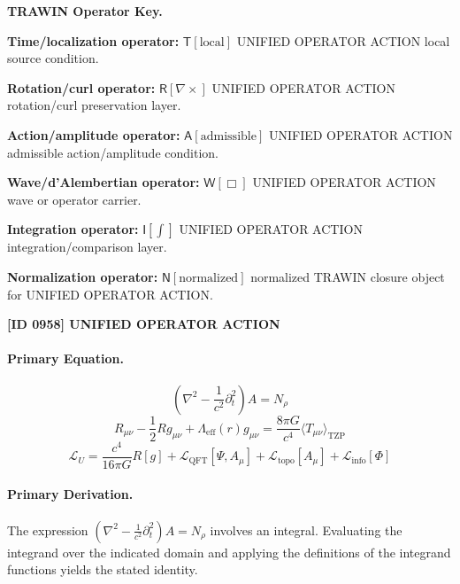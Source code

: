 \par\vspace{0.45\baselineskip}
\noindent\begin{minipage}[t]{\linewidth}
\begingroup
\small
\raggedright
\textbf{TRAWIN Operator Key.}\par
\noindent\textbf{Time/localization operator:} $\mathsf{T}\!\left[\mathrm{local}\right]$ UNIFIED OPERATOR ACTION local source condition.\par
\noindent\textbf{Rotation/curl operator:} $\mathsf{R}\!\left[\nabla\times\right]$ UNIFIED OPERATOR ACTION rotation/curl preservation layer.\par
\noindent\textbf{Action/amplitude operator:} $\mathsf{A}\!\left[\mathrm{admissible}\right]$ UNIFIED OPERATOR ACTION admissible action/amplitude condition.\par
\noindent\textbf{Wave/d'Alembertian operator:} $\mathsf{W}\!\left[\Box\right]$ UNIFIED OPERATOR ACTION wave or operator carrier.\par
\noindent\textbf{Integration operator:} $\mathsf{I}\!\left[\int\right]$ UNIFIED OPERATOR ACTION integration/comparison layer.\par
\noindent\textbf{Normalization operator:} $\mathsf{N}\!\left[\mathrm{normalized}\right]$ normalized TRAWIN closure object for UNIFIED OPERATOR ACTION.\par
\endgroup
\end{minipage}

\clearpage
\noindent\textbf{[ID 0958] UNIFIED OPERATOR ACTION}\par
\vspace{0.35em}
\paragraph{Primary Equation.}
\[
\left(\nabla^{2}-\frac{1}{c^{2}}\partial_{t}^{2}\right)A=N_{\rho}
\]
\[
R_{\mu\nu}-\frac{1}{2}Rg_{\mu\nu}+\Lambda_{\mathrm{eff}}(r)g_{\mu\nu}
=\frac{8\pi G}{c^{4}}\langle T_{\mu\nu}\rangle_{\mathrm{TZP}}
\]
\[
\mathcal{L}_{U}=\frac{c^{4}}{16\pi G}R[g]+\mathcal{L}_{\mathrm{QFT}}[\Psi,A_{\mu}]
+\mathcal{L}_{\mathrm{topo}}[A_{\mu}]+\mathcal{L}_{\mathrm{info}}[\Phi]
\]

\paragraph{Primary Derivation.}
The expression \( \left(\nabla^{2}-\frac{1}{c^{2}}\partial_{t}^{2}\right)A=N_{\rho} \) involves an integral. Evaluating the integrand over the indicated domain and applying the definitions of the integrand functions yields the stated identity.
